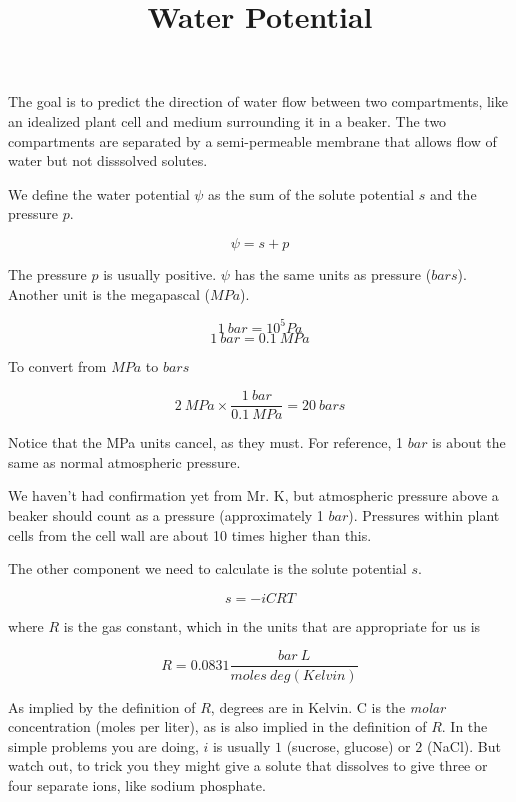 \documentclass[11pt, oneside]{article}   	%
\title{Water Potential}
\date{}							%
\begin{document}
\maketitle
\noindent
\large
The goal is to predict the direction of water flow between two compartments, like an idealized plant cell and medium surrounding it in a beaker.  The two compartments are separated by a semi-permeable membrane that allows flow of water but not disssolved solutes.

We define the water potential $\psi$ as the sum of the solute potential $s$ and the pressure $p$.

\[ \psi = s + p  \]

The pressure $p$ is usually positive.  $\psi$ has the same units as pressure ($bars$).  Another unit is the megapascal ($MPa$). 

\[ 1 \ bar = 10^5 Pa \]
\[ 1 \ bar = 0.1 \ MPa \]

To convert from $MPa$ to $bars$

\[ 2 \ MPa \times \frac{1 \ bar}{0.1 \ MPa} = 20 \ bars \]

Notice that the MPa units cancel, as they must.  For reference, 1 $bar$ is about the same as normal atmospheric pressure.

We haven't had confirmation yet from Mr. K, but atmospheric pressure above a beaker should count as a pressure (approximately 1 $bar$).  Pressures within plant cells from the cell wall are about 10 times higher than this.

The other component we need to calculate is the solute potential $s$.

\[ s = -iCRT \]

where $R$ is the gas constant, which in the units that are appropriate for us is

\[ R = 0.0831 \frac{bar \ L}{moles \ deg(Kelvin)} \]

As implied by the definition of $R$, degrees are in Kelvin.  C is the \emph{molar} concentration (moles per liter), as is also implied in the definition of $R$.  In the simple problems you are doing, $i$ is usually $1$ (sucrose, glucose) or $2$ (NaCl).  But watch out, to trick you they might give a solute that dissolves to give three or four separate ions, like sodium phosphate.
\end{document}
